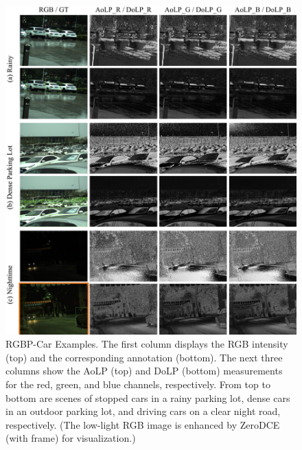 \begin{figure}[ht]
    \begin{center}
        \includegraphics[width=1\linewidth]{figure/dataset.pdf}
    \end{center}
    \caption{
    RGBP-Car Examples. The first column displays the RGB intensity (top) and the corresponding annotation (bottom). The next three columns show the AoLP (top) and DoLP (bottom) measurements for the red, green, and blue channels, respectively. From top to bottom are scenes of stopped cars in a rainy parking lot, dense cars in an outdoor parking lot, and driving cars on a clear night road, respectively. 
    (The low-light RGB image is enhanced by ZeroDCE \cite{guo2020zero} (with  frame) for visualization.)}
    \label{fig:samples}
\end{figure}
